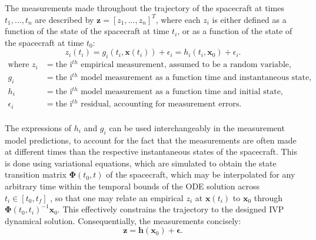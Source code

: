 The measurements made throughout the trajectory of the spacecraft at times
$t_1,...,t_n$ are described by $\bm{z}=[z_1,...,z_n]^T$, where each $z_i$ is
either defined as a function of the state of the spacecraft at time $t_i$, or
as a function of the state of the spacecraft at time $t_0$:
\begin{equation}
    z_i(t_i) = g_i(t_i, \bm{x}(t_i))+\epsilon_i = h_i(t_i, \bm{x}_0)+\epsilon_i.
\end{equation}
\begin{equation*}
    \begin{aligned}
        \textrm{where  }
            z_i &= \text{the i$^{th}$ empirical measurement, assumed to be a random variable,} \\
            g_i &= \text{the i$^{th}$ model measurement as a function time and instantaneous state,} \\
            h_i &= \text{the i$^{th}$ model measurement as a function time and initial state,} \\
            \epsilon_i &= \text{the i$^{th}$ residual, accounting for measurement errors.} \\
    \end{aligned}
\end{equation*}

The expressions of $h_i$ and $g_i$ can be used interchangeably in the measurement model predictions, to account for the fact that the measurements are often made at different times than the respective instantaneous states of the spacecraft. This is done using variational equations, which are simulated to obtain the state transition matrix $\bm{\Phi}(t_0, t)$ of the spacecraft, which may be interpolated for any arbitrary time within the temporal bounds of the ODE solution across $t_i\in[t_0, t_f]$ \cite{Montenbruck2000}, so that one may relate an empirical $z_i$ at $\bm{x}(t_i)$ to $\bm{x}_0$ through $\bm{\Phi}(t_0, t_i)^{-1}\bm{x}_0$. This effectively constrains the trajectory to the designed IVP dynamical solution. Consequentially, the measurements concisely:
\begin{equation}
    \bm{z} = \bm{h}(\bm{x}_0) + \bm{\epsilon}.
\end{equation}





